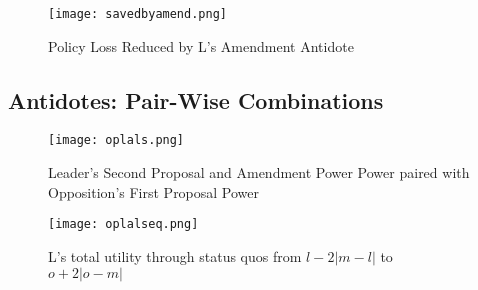 \documentclass[12pt]{article}
\theoremstyle{plain}		      \newtheorem{assn}{Assumption}
\theoremstyle{plain}		      \newtheorem{prop}{Proposition}
\theoremstyle{plain}		      \newtheorem{lemma}{Lemma}
\theoremstyle{plain}	          \newtheorem{imp}{Implication}
\theoremstyle{plain}	          \newtheorem{hyp}{Hypothesis}
\theoremstyle{definition}		  \newtheorem{defn}{Definition}
\theoremstyle{remark}	          \newtheorem{rem}{Remark}
\theoremstyle{definition}         \newtheorem{case}{Case}
\begin{document}
\begin{figure}[h]
\centering
\texttt{[image: savedbyamend.png]}
\caption{Policy Loss Reduced by L's Amendment Antidote}
\label{savedbyamend} 
\end{figure}
\FloatBarrier


\subsection{Antidotes: Pair-Wise Combinations} %
\begin{figure}[h]
  \centering
  \begin{minipage}[b]{0.3\textwidth}
    \texttt{[image: oplals.png]}
    \caption{Leader's Second Proposal and Amendment Power Power paired with Opposition's First Proposal Power}
    \label{oplals}
  \end{minipage}
  \hfill
  \begin{minipage}[b]{0.6\textwidth}
    \texttt{[image: oplalseq.png]}
    \caption{L's total utility through status quos from \newline $l-2|m-l|$ to $o+2|o-m|$}
    \label{oplalseq}
  \end{minipage}
\end{figure}
\FloatBarrier
\end{document}
